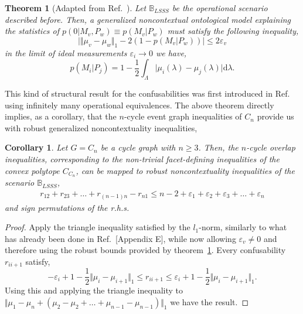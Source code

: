 \documentclass[a4paper,twocolumn,11pt,accepted=2024-01-17]{quantumarticle}
\newtheorem{theorem}{Theorem}
\newtheorem{corollary}{Corollary}
\begin{document}
\begin{theorem}[Adapted from Ref.~\cite{Lostaglio2020contextualadvantage}]\label{theorem: lostagio_senno}
Let $\mathbb{B}_{LSSS}$ be the operational scenario described before. Then, a generalized noncontextual ontological model explaining the statistics of $p(0\vert M_v,P_w) \equiv p(M_v\vert P_w)$ must satisfy the following inequality,
\begin{equation}
    \vert \Vert \mu_v - \mu_w \Vert_1 - 2(1-p(M_v \vert P_w)) \vert \leq 2\varepsilon_v 
\end{equation}
in the limit of ideal measurements $\varepsilon_i \to 0$ we have,
\begin{equation}
    p(M_i \vert P_j) = 1 - \frac{1}{2}\int_\Lambda \vert \mu_i(\lambda) - \mu_j(\lambda)\vert \mathrm{d}\lambda.
\end{equation}
\end{theorem}

This kind of structural result for the confusabilities was first introduced in Ref.~\cite{schmid2018discrimination} using infinitely many operational equivalences. The above theorem directly implies, as a corollary, that the $n$-cycle event graph inequalities of $C_n$ provide us with robust generalized noncontextuality inequalities, 
 

\begin{corollary}
{Let $G=C_n$ be a cycle graph with $n\geq 3$. Then, the $n$-cycle overlap inequalities, corresponding to the non-trivial facet-defining inequalities of the convex polytope $C_{C_n}$, can be mapped to robust noncontextuality inequalities of the scenario $\mathbb{B}_{LSSS}$,}
\begin{align*}
    r_{12}+r_{23}+\dots+r_{(n-1)n}-r_{n1} \leq n-2 + \varepsilon_1+\varepsilon_2+\varepsilon_3+\dots+\varepsilon_n
\end{align*}
and sign permutations of the r.h.s. 
\end{corollary}

\begin{proof}
Apply the triangle inequality satisfied by the $l_1$-norm, similarly to what has already been done in Ref.~[Appendix E]\cite{wagner2022inequalities}, while now allowing $\varepsilon_v \neq 0$ and therefore using the robust bounds provided by theorem~\ref{theorem: lostagio_senno}. Every confusability $r_{ii+1}$ satisfy,
\begin{equation*}
    -\varepsilon_i+1-\frac{1}{2} \Vert \mu_i - \mu_{i+1}  \Vert_1 \leq r_{ii+1}\leq \varepsilon_i + 1 - \frac{1}{2}\Vert \mu_i - \mu_{i+1}  \Vert_1.
\end{equation*}
Using this and applying the triangle inequality to $\Vert \mu_1 - \mu_n + (\mu_2-\mu_2+\dots+\mu_{n-1}-\mu_{n-1})\Vert_1$ we have the result.
\end{proof}
\end{document}

